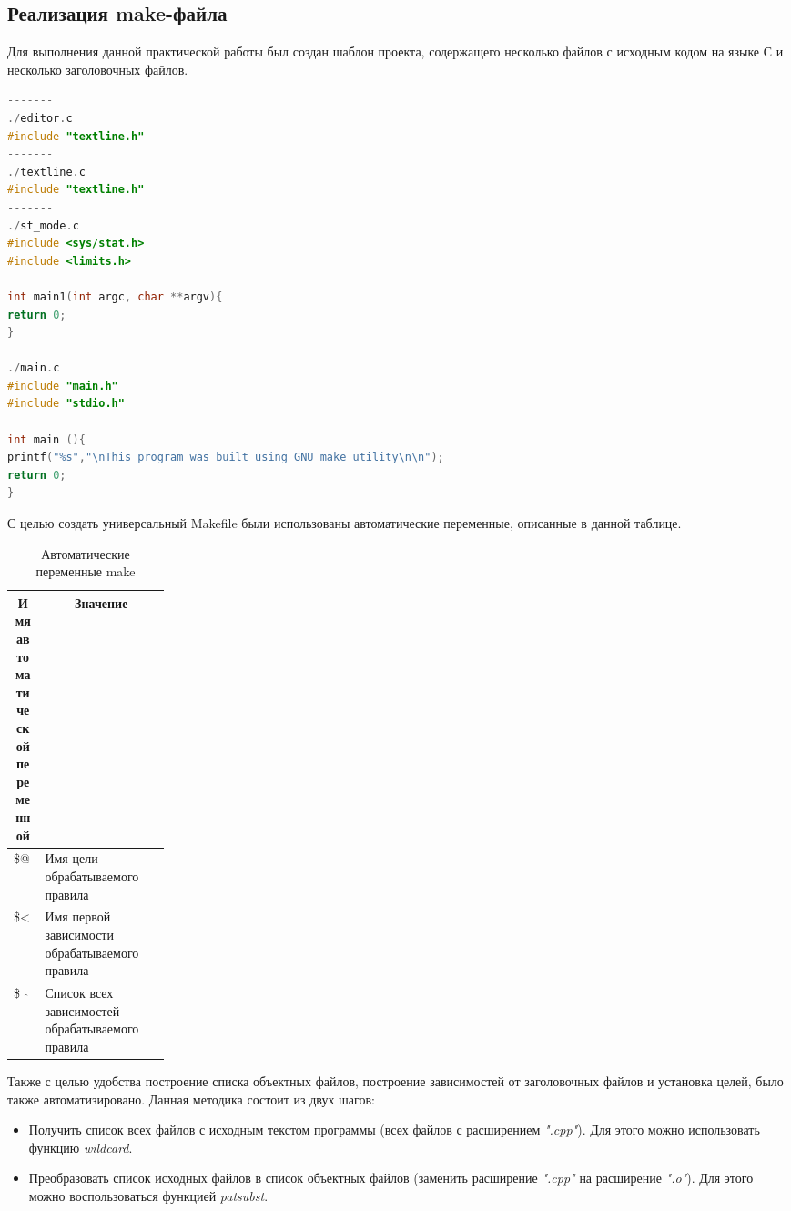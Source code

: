 \documentclass[a4paper,14pt]{extarticle}
\newcommand{\heading}[1]{\multicolumn{1}{|c|}{#1}}
\begin{document}
\subsection*{Реализация make-файла}
Для выполнения данной практической работы был создан шаблон проекта, содержащего несколько файлов с исходным кодом на языке С и несколько заголовочных файлов. 

\begin{lstlisting}[language=C, caption={Содеражание файлов, используемых в проекте}]
-------
./editor.c
#include "textline.h"
-------
./textline.c
#include "textline.h"
-------
./st_mode.c
#include <sys/stat.h>
#include <limits.h>

int main1(int argc, char **argv){
return 0;
}
-------
./main.c
#include "main.h"
#include "stdio.h"

int main (){
printf("%s","\nThis program was built using GNU make utility\n\n");
return 0;
}

\end{lstlisting}

С целью создать универсальный Makefile были использованы автоматические переменные, описанные в данной таблице.

\begin{table}[h!]
	\caption{Автоматические переменные make}
	\small
	\begin{tabular}{|p{0.2\linewidth}|l|}
		\hline
		\heading{Имя автоматической переменной} & \heading{Значение} \\ \hline
		\$@	&Имя цели обрабатываемого правила\\ \hline
		\$<	&Имя первой зависимости обрабатываемого правила\\ \hline
		\$${\mbox{ }}\hat{}$&	Список всех зависимостей обрабатываемого правила\\ \hline
	\end{tabular}
	\label{tab:auto-vars}
\end{table}



Также с целью удобства построение списка объектных файлов, построение зависимостей от заголовочных файлов и установка целей, было также автоматизировано. 
Данная методика состоит из двух шагов:
\begin{itemize}
	\item Получить список всех файлов с исходным текстом программы (всех файлов с расширением \textit{".cpp"}). Для этого можно использовать функцию \textit{wildcard}.
	\item Преобразовать список исходных файлов в список объектных файлов (заменить расширение \textit{".cpp"} на расширение \textit{".o"}). Для этого можно воспользоваться функцией \textit{patsubst}.
\end{itemize}
\end{document}
